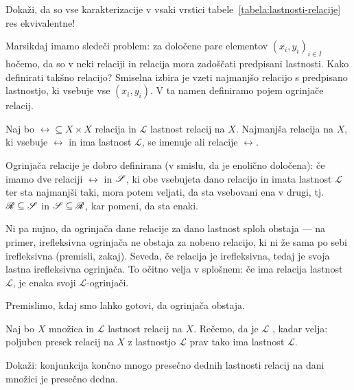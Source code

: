                 \begin{naloga}
                        Dokaži, da so vse karakterizacije v vsaki vrstici tabele~\ref{tabela:lastnosti-relacije} res ekvivalentne!
                \end{naloga}

                Marsikdaj imamo sledeči problem: za določene pare elementov $(x_i, y_i)_{i \in I}$ hočemo, da so v neki relaciji in relacija mora zadoščati predpisani lastnosti. Kako definirati takšno relacijo? Smiselna izbira je vzeti najmanjšo relacijo s predpisano lastnostjo, ki vsebuje vse $(x_i, y_i)$. V ta namen definiramo pojem ogrinjače relacij.

                \begin{definicija}
                        Naj bo $\rel \subseteq X \times X$ relacija in $\mathscr{L}$ lastnost relacij na $X$. Najmanjša relacija na $X$, ki vsebuje $\rel$ in ima lastnost $\mathscr{L}$, se imenuje  ali  relacije $\rel$.
                \end{definicija}

                Ogrinjača relacije je dobro definirana (v smislu, da je enolično določena): če imamo dve relaciji $\rel$ in $\srel$, ki obe vsebujeta dano relacijo in imata lastnost $\mathscr{L}$ ter sta najmanjši taki, mora potem veljati, da sta vsebovani ena v drugi, tj.~$\rel \subseteq \srel$ in $\srel \subseteq \rel$, kar pomeni, da sta enaki.

                Ni pa nujno, da ogrinjača dane relacije za dano lastnost sploh obstaja --- na primer, irefleksivna ogrinjača ne obstaja za nobeno relacijo, ki ni že sama po sebi irefleksivna (premisli, zakaj). Seveda, če relacija je irefleksivna, tedaj je svoja lastna irefleksivna ogrinjača. To očitno velja v splošnem: če ima relacija lastnost $\mathscr{L}$, je enaka svoji $\mathscr{L}$-ogrinjači.

                Premislimo, kdaj smo lahko gotovi, da ogrinjača obstaja.

                \begin{definicija}
                        Naj bo $X$ množica in $\mathscr{L}$ lastnost relacij na $X$. Rečemo, da je $\mathscr{L}$ , kadar velja: poljuben presek relacij na $X$ z lastnostjo $\mathscr{L}$ prav tako ima lastnost $\mathscr{L}$.
                \end{definicija}

                \begin{naloga}\label{naloga:presecna-dednost-zaprta-za-konjunkcije}
                        Dokaži: konjunkcija končno mnogo presečno dednih lastnosti relacij na dani množici je presečno dedna.
                \end{naloga}

